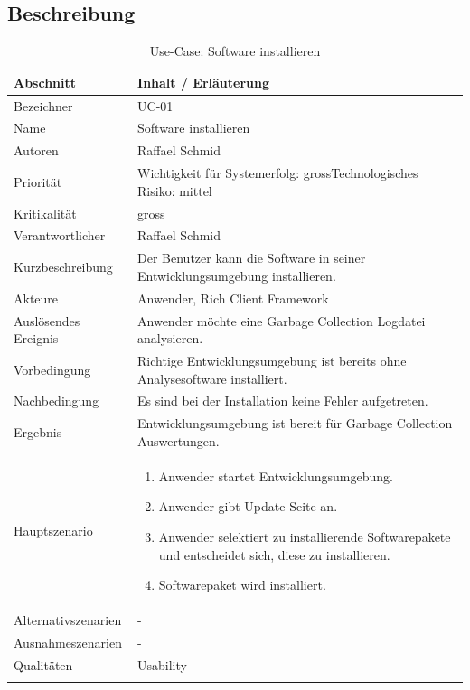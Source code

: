 \subsection{Beschreibung}
\begin{longtable}{|p{4cm}|p{10.5cm}|}
  \hline
   \textbf{Abschnitt} & \textbf{Inhalt / Erläuterung} \\\hline
   Bezeichner & UC-01\\\hline
   Name & Software installieren\\\hline
   Autoren & Raffael Schmid\\\hline
   Priorität & Wichtigkeit für Systemerfolg: gross\newline Technologisches Risiko: mittel\\\hline
   Kritikalität & gross\\\hline
   Verantwortlicher & Raffael Schmid\\\hline
   Kurzbeschreibung & Der Benutzer kann die Software in seiner Entwicklungsumgebung installieren.\\\hline
   Akteure & Anwender, Rich Client Framework\\\hline
   Auslösendes Ereignis & Anwender möchte eine Garbage Collection Logdatei analysieren.\\\hline
   Vorbedingung & Richtige Entwicklungsumgebung ist bereits ohne Analysesoftware installiert.\\\hline
   Nachbedingung & Es sind bei der Installation keine Fehler aufgetreten.\\\hline
   Ergebnis & Entwicklungsumgebung ist bereit für Garbage Collection Auswertungen.\\\hline
   Hauptszenario & 
         \begin{enumerate}
		\item Anwender startet Entwicklungsumgebung.
		\item Anwender gibt Update-Seite an.
		\item Anwender selektiert zu installierende Softwarepakete und entscheidet sich, diese zu installieren.
		\item Softwarepaket wird installiert.
 	\end{enumerate}
	\\\hline
   Alternativszenarien & -\\\hline
   Ausnahmeszenarien & -\\\hline
   Qualitäten & Usability\\\hline
\caption{Use-Case: Software installieren}
\end{longtable}

